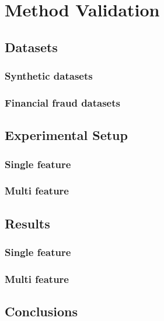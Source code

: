 \chapter{Method Validation} \label{chap:validation} \minitoc

\section{Datasets}
\subsection{Synthetic datasets}
\subsection{Financial fraud datasets}

\section{Experimental Setup}
\subsection{Single feature}
\subsection{Multi feature}

\section{Results}
\subsection{Single feature}
\subsection{Multi feature}

\section{Conclusions}

